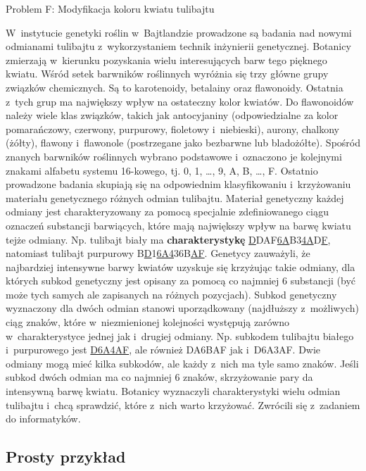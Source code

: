 \documentclass{article}
\begin{document}
\begin{center}
  \begin{Huge}
    Problem F: Modyfikacja koloru kwiatu tulibajtu
  \end{Huge}
\end{center}

W~instytucie genetyki roślin w~Bajtlandzie prowadzone są badania nad nowymi odmianami tulibajtu z~wykorzystaniem technik
inżynierii genetycznej. Botanicy zmierzają w~kierunku pozyskania wielu interesujących barw tego pięknego kwiatu. Wśród
setek barwników roślinnych wyróżnia się trzy główne grupy związków chemicznych. Są to karotenoidy, betalainy oraz
flawonoidy. Ostatnia z~tych grup ma największy wpływ na ostateczny kolor kwiatów. Do flawonoidów należy wiele klas
związków, takich jak antocyjaniny (odpowiedzialne za kolor pomarańczowy, czerwony, purpurowy, fioletowy i~niebieski),
aurony, chalkony (żółty), flawony i~flawonole (postrzegane jako bezbarwne lub bladożółte). Spośród znanych barwników
roślinnych wybrano podstawowe i~oznaczono je kolejnymi znakami alfabetu systemu 16-kowego, tj. 0, 1, \ldots, 9, A, B, \ldots, F.
Ostatnio prowadzone badania skupiają się na odpowiednim klasyfikowaniu i~krzyżowaniu materiału genetycznego różnych
odmian tulibajtu. Materiał genetyczny każdej odmiany jest charakteryzowany za pomocą specjalnie zdefiniowanego ciągu
oznaczeń substancji barwiących, które mają największy wpływ na barwę kwiatu tejże odmiany. Np. tulibajt biały ma
\textbf{charakterystykę} \underline{D}DAF\underline{6A}B3\underline{4A}D\underline{F},
natomiast tulibajt purpurowy B\underline{D}1\underline{6A4}36B\underline{AF}. Genetycy zauważyli, że najbardziej
intensywne barwy kwiatów uzyskuje się krzyżując takie odmiany, dla których subkod genetyczny jest opisany za pomocą co
najmniej 6 substancji (być może tych samych ale zapisanych na różnych pozycjach). Subkod genetyczny wyznaczony dla
dwóch odmian stanowi uporządkowany (najdłuższy z~możliwych) ciąg znaków, które w~niezmienionej kolejności występują
zarówno w~charakterystyce jednej jak i~drugiej odmiany. Np. subkodem tulibajtu białego i~purpurowego jest \underline{D6A4AF}, ale
również DA6BAF jak i~D6A3AF. Dwie odmiany mogą mieć kilka subkodów, ale każdy z~nich ma tyle samo znaków. Jeśli
subkod dwóch odmian ma co najmniej 6 znaków, skrzyżowanie pary da intensywną barwę kwiatu. Botanicy wyznaczyli
charakterystyki wielu odmian tulibajtu i~chcą sprawdzić, które z~nich warto krzyżować. Zwrócili się z~zadaniem do
informatyków.

\subsection*{Prosty przykład}
\end{document}
